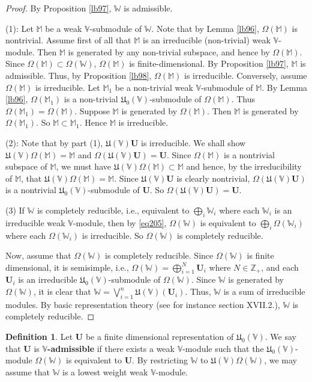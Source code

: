 \documentclass[12pt,a4paper,notitlepage]{report}
\theoremstyle{definition}
\newtheorem{df}{Definition}[section]
\theoremstyle{plain}
\newcommand{\fk}{\mathfrak}
\newcommand{\mbf}{\mathbf}
\newcommand{\Vbb}{\mathbb V}
\newcommand{\Wbb}{\mathbb W}
\newcommand{\Mbb}{\mathbb M}
\newcommand{\Zbb}{\mathbb Z}
\numberwithin{equation}{section}
\begin{document}
\begin{proof}
By Proposition \ref{lb97}, $\Wbb$ is admissible.

(1): Let $\Mbb$ be a weak $\Vbb$-submodule of $\Wbb$. Note that by Lemma \ref{lb96}, $\Omega(\Mbb)$ is nontrivial. Assume first of all that $\Mbb$ is an irreducible (non-trivial) weak $\Vbb$-module. Then $\Mbb$ is generated by any non-trivial subspace, and hence by $\Omega(\Mbb)$. Since $\Omega(\Mbb)\subset\Omega(\Wbb)$, $\Omega(\Mbb)$ is finite-dimensional. By Proposition \ref{lb97}, $\Mbb$ is admissible. Thus, by Proposition \ref{lb98}, $\Omega(\Mbb)$ is irreducible. Conversely, assume $\Omega(\Mbb)$ is irreducible. Let $\Mbb_1$ be a non-trivial weak $\Vbb$-submodule of $\Mbb$. By Lemma \ref{lb96}, $\Omega(\Mbb_1)$ is a non-trivial $\fk U_0(\Vbb)$-submodule of $\Omega(\Mbb)$. Thus $\Omega(\Mbb_1)=\Omega(\Mbb)$. Suppose $\Mbb$ is generated by $\Omega(\Mbb)$. Then $\Mbb$ is generated by $\Omega(\Mbb_1)$. So $\Mbb\subset\Mbb_1$. Hence $\Mbb$ is irreducible.


(2): Note that by part (1), $\fk U(\Vbb)\mbf U$ is irreducible. We shall show $\fk U(\Vbb)\Omega(\Mbb)=\Mbb$ and $\Omega(\fk U(\Vbb)\mbf U)=\mbf U$.  Since $\Omega(\Mbb)$ is a nontrivial subspace of $\Mbb$, we must have $\fk U(\Vbb)\Omega(\Mbb)\subset\Mbb$ and hence, by the irreducibility of $\Mbb$, that $\fk U(\Vbb)\Omega(\Mbb)=\Mbb$. Since $\fk U(\Vbb)\mbf U$ is clearly nontrivial, $\Omega(\fk U(\Vbb)\mbf U)$ is a nontrivial $\fk U_0(\Vbb)$-submodule of $\mbf U$. So $\Omega(\fk U(\Vbb)\mbf U)=\mbf U$.

(3) If $\Wbb$ is completely reducible, i.e., equivalent to $\bigoplus_i\Wbb_i$ where each $\Wbb_i$ is an irreducible weak $\Vbb$-module, then by \eqref{eq205}, $\Omega(\Wbb)$ is equivalent to $\bigoplus_i\Omega(\Wbb_i)$ where each $\Omega(\Wbb_i)$ is irreducible. So $\Omega(\Wbb)$ is completely reducible.

Now, assume that $\Omega(\Wbb)$ is completely reducible. Since  $\Omega(\Wbb)$ is finite dimensional, it is semisimple, i.e., $\Omega(\Wbb)=\bigoplus_{i=1}^N\mbf U_i$ where $N\in\Zbb_+$, and each $\mbf U_i$ is an irreducible $\fk U_0(\Vbb)$-submodule of $\Omega(\Wbb)$. Since $\Wbb$ is generated by $\Omega(\Wbb)$, it is clear that $\Wbb=\bigvee_{i=1}^n \fk U(\Vbb)(\mbf U_i)$. Thus, $\Wbb$ is a sum of irreducible modules. By basic representation theory (see for instance \cite{Lang} section XVII.2.), $\Wbb$ is completely reducible.
\end{proof}

\begin{df}
Let $\mbf U$ be a finite dimensional representation of $\fk U_0(\Vbb)$. We say that $\mbf U$ is \textbf{$\Vbb$-admissible} if there exists a weak $\Vbb$-module such that the $\fk U_0(\Vbb)$-module $\Omega(\Wbb)$ is equivalent to $\mbf U$. By restricting $\Wbb$ to $\fk U(\Vbb)\Omega(\Wbb)$, we may assume that $\Wbb$ is a lowest weight weak $\Vbb$-module.
\end{df}
\end{document}
